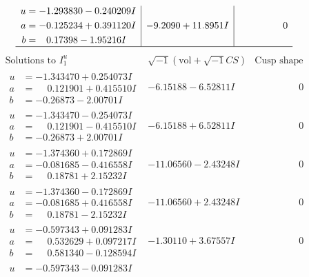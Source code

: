 \documentclass[1p]{elsarticle_modified}
\theoremstyle{definition}
\newcommand{\I}{\sqrt{-1}}
\begin{document}
$$\begin{array}{c|c|c}
\begin{aligned}
u &= -1.293830 - 0.240209 I \\
a &= -0.125234 + 0.391120 I \\
b &= \phantom{-}0.17398 - 1.95216 I\end{aligned}
 & -9.2090 + 11.8951 I & \phantom{-0.000000 } 0\\
 \hline 
 \end{array}$$\newpage$$\begin{array}{c|c|c}  
\text{Solutions to }I^u_{1}& \I (\text{vol} + \sqrt{-1}CS) & \text{Cusp shape}\\
 \hline 
\begin{aligned}
u &= -1.343470 + 0.254073 I \\
a &= \phantom{-}0.121901 + 0.415510 I \\
b &= -0.26873 - 2.00701 I\end{aligned}
 & -6.15188 - 6.52811 I & \phantom{-0.000000 } 0 \\ \hline\begin{aligned}
u &= -1.343470 - 0.254073 I \\
a &= \phantom{-}0.121901 - 0.415510 I \\
b &= -0.26873 + 2.00701 I\end{aligned}
 & -6.15188 + 6.52811 I & \phantom{-0.000000 } 0 \\ \hline\begin{aligned}
u &= -1.374360 + 0.172869 I \\
a &= -0.081685 - 0.416558 I \\
b &= \phantom{-}0.18781 + 2.15232 I\end{aligned}
 & -11.06560 - 2.43248 I & \phantom{-0.000000 } 0 \\ \hline\begin{aligned}
u &= -1.374360 - 0.172869 I \\
a &= -0.081685 + 0.416558 I \\
b &= \phantom{-}0.18781 - 2.15232 I\end{aligned}
 & -11.06560 + 2.43248 I & \phantom{-0.000000 } 0 \\ \hline\begin{aligned}
u &= -0.597343 + 0.091283 I \\
a &= \phantom{-}0.532629 + 0.097217 I \\
b &= \phantom{-}0.581340 - 0.128594 I\end{aligned}
 & -1.30110 + 3.67557 I & \phantom{-0.000000 } 0 \\ \hline\begin{aligned}
u &= -0.597343 - 0.091283 I \\

\end{aligned}
\end{array}$$
\end{document}
